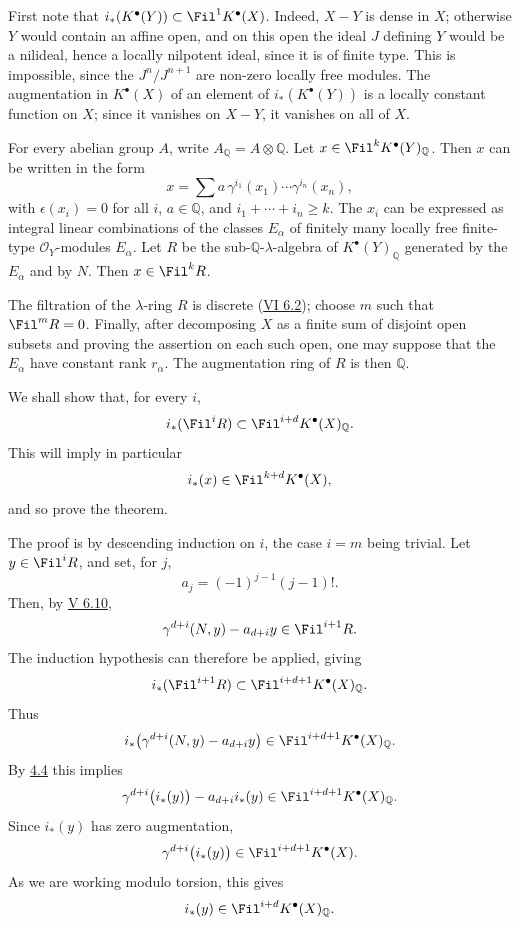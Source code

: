 First note that \(i_*(K^\bullet(Y))\subset \Fil^1K^\bullet(X)\). Indeed, \(X-Y\) is dense in \(X\); otherwise \(Y\) would contain an affine open, and on this open the ideal \(J\) defining \(Y\) would be a nilideal, hence a locally nilpotent ideal, since it is of finite type. This is impossible, since the \(J^n/J^{n+1}\) are non-zero locally free modules. The augmentation in \(K^\bullet(X)\) of an element of \(i_*(K^\bullet(Y))\) is a locally constant function on \(X\); since it vanishes on \(X-Y\), it vanishes on all of \(X\).

For every abelian group \(A\), write \(A_{\mathbb Q}=A\otimes\mathbb Q\). Let \(x\in\Fil^kK^\bullet(Y)_{\mathbb Q}\). Then \(x\) can be written in the form
\[
  x=\sum a\,\gamma^{i_1}(x_1)\cdots\gamma^{i_n}(x_n),
\]
with \(\epsilon(x_i)=0\) for all \(i\), \(a\in\mathbb Q\), and \(i_1+\cdots+i_n\ge k\). The \(x_i\) can be expressed as integral linear combinations of the classes \(E_\alpha\) of finitely many locally free finite-type \(\mathcal O_Y\)-modules \(E_\alpha\). Let \(R\) be the sub-\(\mathbb Q\)-\(\lambda\)-algebra of \(K^\bullet(Y)_{\mathbb Q}\) generated by the \(E_\alpha\) and by \(N\). Then \(x\in\Fil^kR\).

The filtration of the \(\lambda\)-ring \(R\) is discrete (\hyperlink{sga6.e06.prop.6-2}{VI 6.2}); choose \(m\) such that \(\Fil^mR=0\). Finally, after decomposing \(X\) as a finite sum of disjoint open subsets and proving the assertion on each such open, one may suppose that the \(E_\alpha\) have constant rank \(r_\alpha\). The augmentation ring of \(R\) is then \(\mathbb Q\).

We shall show that, for every \(i\),
\[
  i_*(\Fil^iR)\subset \Fil^{i+d}K^\bullet(X)_{\mathbb Q}.
\]
This will imply in particular
\[
  i_*(x)\in\Fil^{k+d}K^\bullet(X),
\]
and so prove the theorem.

The proof is by descending induction on \(i\), the case \(i=m\) being trivial. Let \(y\in\Fil^iR\), and set, for \(j\),
\[
  a_j=(-1)^{j-1}(j-1)!.
\]
Then, by \hyperlink{sga6.e05.prop.6-10}{V 6.10},
\[
  \gamma^{d+i}(N,y)-a_{d+i}y\in\Fil^{i+1}R.
\]
The induction hypothesis can therefore be applied, giving
\[
  i_*(\Fil^{i+1}R)\subset\Fil^{i+d+1}K^\bullet(X)_{\mathbb Q}.
\]
Thus
\[
  i_*\bigl(\gamma^{d+i}(N,y)-a_{d+i}y\bigr)
  \in\Fil^{i+d+1}K^\bullet(X)_{\mathbb Q}.
\]
By \hyperlink{sga6.e07.cor.4-4}{4.4} this implies
\[
  \gamma^{d+i}\bigl(i_*(y)\bigr)-a_{d+i}i_*(y)
  \in\Fil^{i+d+1}K^\bullet(X)_{\mathbb Q}.
\]
Since \(i_*(y)\) has zero augmentation,
\[
  \gamma^{d+i}\bigl(i_*(y)\bigr)\in\Fil^{i+d+1}K^\bullet(X).
\]
As we are working modulo torsion, this gives
\[
  i_*(y)\in\Fil^{i+d}K^\bullet(X)_{\mathbb Q}.
\]

